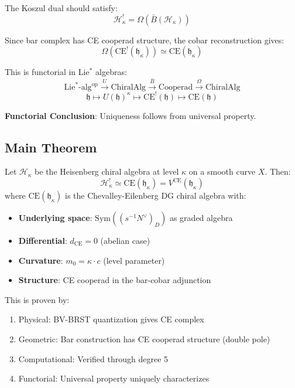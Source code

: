 \begin{example}
The Koszul dual should satisfy:
$$\mathcal{H}_\kappa^! = \Omega(\bar{B}(\mathcal{H}_\kappa))$$

Since bar complex has CE cooperad structure, the cobar reconstruction gives:
$$\Omega(\text{CE}^!(\mathfrak{h}_\kappa)) \simeq \text{CE}(\mathfrak{h}_\kappa)$$

This is functorial in Lie$^*$ algebras:
$$\text{Lie}^*\text{-alg}^{\text{op}} \xrightarrow{U} \text{ChiralAlg} \xrightarrow{\bar{B}} \text{Cooperad} \xrightarrow{\Omega} \text{ChiralAlg}$$
$$\mathfrak{h} \mapsto U(\mathfrak{h})^\kappa \mapsto \text{CE}^!(\mathfrak{h}) \mapsto \text{CE}(\mathfrak{h})$$

\textbf{Functorial Conclusion}: Uniqueness follows from universal property.

\subsection{Main Theorem}

\begin{theorem}
Let $\mathcal{H}_\kappa$ be the Heisenberg chiral algebra at level $\kappa$ on a smooth curve $X$. Then:
$$\mathcal{H}_\kappa^! \simeq \text{CE}(\mathfrak{h}_\kappa) = V^{\text{CE}}(\mathfrak{h}_\kappa)$$
where $\text{CE}(\mathfrak{h}_\kappa)$ is the Chevalley-Eilenberg DG chiral algebra with:
\begin{itemize}
\item \textbf{Underlying space}: $\text{Sym}((s^{-1}N^\vee)_D)$ as graded algebra
\item \textbf{Differential}: $d_{\text{CE}} = 0$ (abelian case)
\item \textbf{Curvature}: $m_0 = \kappa \cdot c$ (level parameter)
\item \textbf{Structure}: CE cooperad in the bar-cobar adjunction
\end{itemize}

This is proven by:
\begin{enumerate}
\item Physical: BV-BRST quantization gives CE complex
\item Geometric: Bar construction has CE cooperad structure (double pole)
\item Computational: Verified through degree 5
\item Functorial: Universal property uniquely characterizes
\end{enumerate}
\end{theorem}


\end{example}
